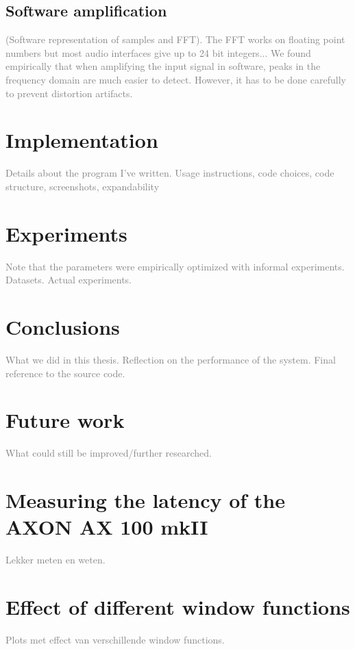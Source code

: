 \documentclass[10pt,twocolumn]{article}
\begin{document}
\subsection{Software amplification}
\textcolor{gray}{(Software representation of samples and FFT). The FFT works on floating point numbers but most audio interfaces give up to 24 bit integers...}
\textcolor{gray}{We found empirically that when amplifying the input signal in software, peaks in the frequency domain are much easier to detect. However, it has to be done carefully to prevent distortion artifacts.}


\section{Implementation}
\textcolor{gray}{Details about the program I've written. Usage instructions, code choices, code structure, screenshots, expandability}


\section{Experiments}  \label{sec:exp}
\textcolor{gray}{Note that the parameters were empirically optimized with informal experiments. Datasets. Actual experiments.}


\section{Conclusions}
\textcolor{gray}{What we did in this thesis. Reflection on the performance of the system. Final reference to the source code.}


\section{Future work}  \label{sec:future}
\textcolor{gray}{What could still be improved/further researched.}



\appendix
\section{Measuring the latency of the AXON AX 100 mkII}  \label{sec:ax100}
\textcolor{gray}{Lekker meten en weten.}

\section{Effect of different window functions}
\textcolor{gray}{Plots met effect van verschillende window functions.}




\end{document}
